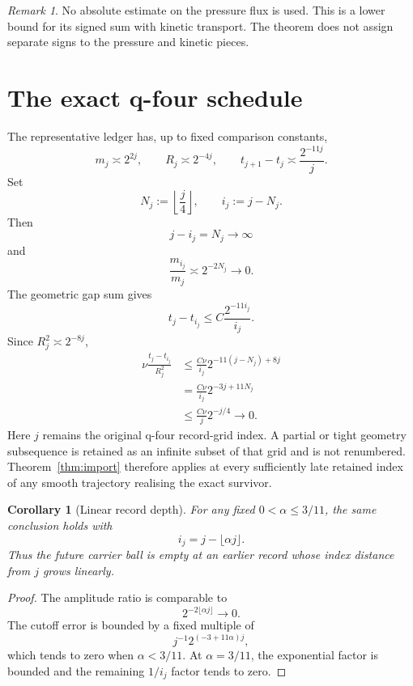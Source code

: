 \documentclass[11pt]{article}
\newtheorem{corollary}[theorem]{Corollary}
\theoremstyle{remark}
\newtheorem{remark}[theorem]{Remark}
\begin{document}
\begin{remark}
No absolute estimate on the pressure flux is used.  This is a lower bound
for its signed sum with kinetic transport.  The theorem does not assign
separate signs to the pressure and kinetic pieces.
\end{remark}

\section{The exact q-four schedule}

The representative ledger has, up to fixed comparison constants,
\[
 m_j\asymp2^{2j},
 \qquad
 R_j\asymp2^{-4j},
 \qquad
 t_{j+1}-t_j\asymp\frac{2^{-11j}}j.
\]
Set
\[
 N_j:=\left\lfloor\frac j4\right\rfloor,
 \qquad
 i_j:=j-N_j.
\]
Then
\[
 j-i_j=N_j\longrightarrow\infty
\]
and
\[
 \frac{m_{i_j}}{m_j}
 \asymp
 2^{-2N_j}
 \longrightarrow0.
\]
The geometric gap sum gives
\[
 t_j-t_{i_j}
 \le
 C\frac{2^{-11i_j}}{i_j}.
\]
Since \(R_j^2\asymp2^{-8j}\),
\[
\begin{aligned}
 \nu\frac{t_j-t_{i_j}}{R_j^2}
 &\le
 \frac{C\nu}{i_j}
 2^{-11(j-N_j)+8j}\\
 &=
 \frac{C\nu}{i_j}
 2^{-3j+11N_j}\\
 &\le
 \frac{C\nu}{j}
 2^{-j/4}
 \longrightarrow0.
\end{aligned}
\]
Here \(j\) remains the original q-four record-grid index.  A partial or
tight geometry subsequence is retained as an infinite subset of that grid
and is not renumbered.  Theorem~\ref{thm:import} therefore applies at every
sufficiently late retained index of any smooth trajectory realising the
exact survivor.

\begin{corollary}[Linear record depth]
\label{cor:depth}
For any fixed \(0<\alpha\le3/11\), the same conclusion holds with
\[
 i_j=j-\lfloor\alpha j\rfloor.
\]
Thus the future carrier ball is empty at an earlier record whose index
distance from \(j\) grows linearly.
\end{corollary}

\begin{proof}
The amplitude ratio is comparable to
\[
 2^{-2\lfloor\alpha j\rfloor}\longrightarrow0.
\]
The cutoff error is bounded by a fixed multiple of
\[
 j^{-1}2^{(-3+11\alpha)j},
\]
which tends to zero when \(\alpha<3/11\).  At \(\alpha=3/11\), the
exponential factor is bounded and the remaining \(1/i_j\) factor tends to
zero.
\end{proof}
\end{document}
